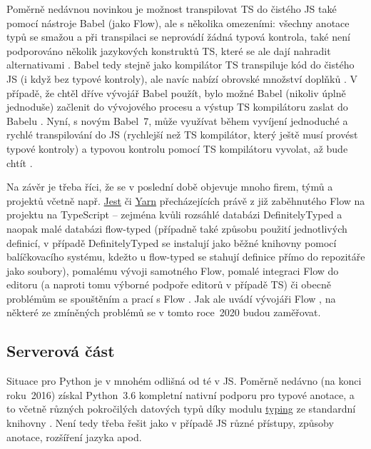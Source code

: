 Poměrně nedávnou novinkou je možnost transpilovat TS do čistého JS také pomocí nástroje Babel (jako Flow), ale s několika omezeními: všechny anotace typů se smažou a při transpilaci se neprovádí žádná typová kontrola, také není podporováno několik jazykových konstruktů TS, které se ale dají nahradit alternativami \cite{types-iamturns}. Babel tedy stejně jako kompilátor TS transpiluje kód do čistého JS (i když bez typové kontroly), ale navíc nabízí obrovské množství doplňků \cite{types-iamturns}. V případě, že chtěl dříve vývojář Babel použít, bylo možné Babel (nikoliv úplně jednoduše) začlenit do vývojového procesu a výstup TS kompilátoru zaslat do Babelu \cite{types-iamturns}. Nyní, s novým Babel~7, může využívat během vyvíjení jednoduché a rychlé transpilování do JS (rychlejší než TS kompilátor, který ještě musí provést typové kontroly) a typovou kontrolu pomocí TS kompilátoru vyvolat, až bude chtít \cite{types-iamturns}.

Na závěr je třeba říci, že se v poslední době objevuje mnoho firem, týmů a projektů včetně např. \href{https://jestjs.io/}{Jest} či \href{https://yarnpkg.com/}{Yarn} přecházejících právě z již zaběhnutého Flow na projektu na TypeScript -- zejména kvůli rozsáhlé databázi DefinitelyTyped a naopak malé databázi flow-typed (případně také způsobu použití jednotlivých definicí, v případě DefinitelyTyped se instalují jako běžné knihovny pomocí balíčkovacího systému, kdežto u flow-typed se stahují definice přímo do repozitáře jako soubory), pomalému vývoji samotného Flow, pomalé integraci Flow do editoru (a naproti tomu výborné podpoře editorů v případě TS) či obecně problémům se spouštěním a prací s Flow \cite{types-flow1, types-flow2, types-flow3}. Jak ale uvádí vývojáři Flow \cite{types-flow4}, na některé ze zmíněných problémů se v tomto roce~2020 budou zaměřovat.


\subsection{Serverová část}

Situace pro Python je v mnohém odlišná od té v JS. Poměrně nedávno (na konci roku~2016) získal Python~3.6 kompletní nativní podporu pro typové anotace, a to včetně různých pokročilých datových typů díky modulu \href{https://docs.python.org/3/library/typing.html}{typing} ze standardní knihovny \cite{types-python-bernat}. Není tedy třeba řešit jako v případě JS různé přístupy, způsoby anotace, rozšíření jazyka apod.

